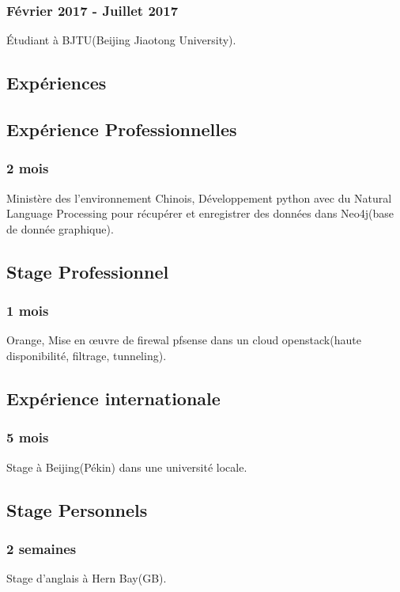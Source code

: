 \documentclass{article}
\begin{document}
        \subsubsection{F\'evrier 2017 - Juillet 2017}
            \'Etudiant \`a BJTU(Beijing Jiaotong University).

    \vspace{1cm}

    \begin{multicols}{2}
        \section{Exp\'eriences}
            \subsection{Exp\'erience Professionnelles}
                \subsubsection{2 mois}
                    Minist\`ere des l'environnement Chinois, D\'eveloppement python avec du Natural Language Processing pour r\'ecup\'erer et enregistrer des donn\'ees dans Neo4j(base de donnée graphique).
            \subsection{Stage Professionnel}
                \subsubsection{1 mois}
                    Orange, Mise en \oe{}uvre de firewal pfsense dans un cloud openstack(haute disponibilit\'e, filtrage, tunneling).
            \subsection{Exp\'erience internationale}
                \subsubsection{5 mois}
                    Stage \`a Beijing(P\'ekin) dans une universit\'e locale.
            \subsection{Stage Personnels}
                \subsubsection{2 semaines}
                    Stage d'anglais \`a Hern Bay(GB).

\end{multicols}
\end{document}
